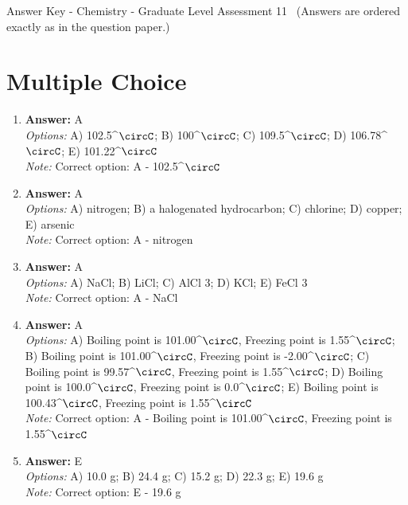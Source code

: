 \documentclass[12pt]{article}
\begin{document}
\begin{center}
Answer Key - Chemistry - Graduate Level Assessment 11 \
\small (Answers are ordered exactly as in the question paper.)
\end{center}

\section*{Multiple Choice}
\begin{enumerate}[label=\arabic*.]
\item \textbf{Answer:} A
\\ \textit{Options:} A) 102.5^\ensuremath{\circC}; B) 100^\ensuremath{\circC}; C) 109.5^\ensuremath{\circC}; D) 106.78^\ensuremath{\circC}; E) 101.22^\ensuremath{\circC}
\\ \textit{Note:} Correct option: A - 102.5^\ensuremath{\circC}
\item \textbf{Answer:} A
\\ \textit{Options:} A) nitrogen; B) a halogenated hydrocarbon; C) chlorine; D) copper; E) arsenic
\\ \textit{Note:} Correct option: A - nitrogen
\item \textbf{Answer:} A
\\ \textit{Options:} A) NaCl; B) LiCl; C) AlCl 3; D) KCl; E) FeCl 3
\\ \textit{Note:} Correct option: A - NaCl
\item \textbf{Answer:} A
\\ \textit{Options:} A) Boiling point is 101.00^\ensuremath{\circC}, Freezing point is 1.55^\ensuremath{\circC}; B) Boiling point is 101.00^\ensuremath{\circC}, Freezing point is -2.00^\ensuremath{\circC}; C) Boiling point is 99.57^\ensuremath{\circC}, Freezing point is 1.55^\ensuremath{\circC}; D) Boiling point is 100.0^\ensuremath{\circC}, Freezing point is 0.0^\ensuremath{\circC}; E) Boiling point is 100.43^\ensuremath{\circC}, Freezing point is 1.55^\ensuremath{\circC}
\\ \textit{Note:} Correct option: A - Boiling point is 101.00^\ensuremath{\circC}, Freezing point is 1.55^\ensuremath{\circC}
\item \textbf{Answer:} E
\\ \textit{Options:} A) 10.0 g; B) 24.4 g; C) 15.2 g; D) 22.3 g; E) 19.6 g
\\ \textit{Note:} Correct option: E - 19.6 g
\end{enumerate}
\end{document}
